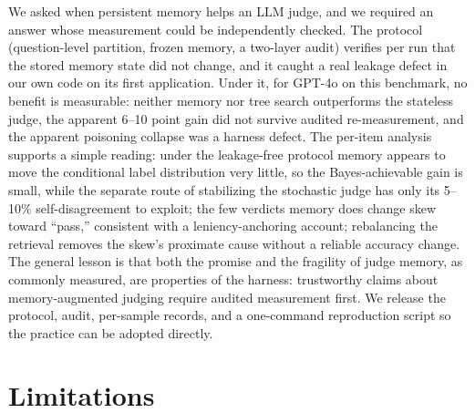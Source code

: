 \documentclass[]{ceurart}
\begin{document}
We asked when persistent memory helps an LLM judge, and we required an answer whose measurement could be independently checked. The protocol (question-level partition, frozen memory, a two-layer audit) verifies per run that the stored memory state did not change, and it caught a real leakage defect in our own code on its first application. Under it, for GPT-4o on this benchmark, no benefit is measurable: neither memory nor tree search outperforms the stateless judge, the apparent 6--10 point gain did not survive audited re-measurement, and the apparent poisoning collapse was a harness defect. The per-item analysis supports a simple reading: under the leakage-free protocol memory appears to move the conditional label distribution very little, so the Bayes-achievable gain is small, while the separate route of stabilizing the stochastic judge has only its 5--10\% self-disagreement to exploit; the few verdicts memory does change skew toward ``pass,'' consistent with a leniency-anchoring account; rebalancing the retrieval removes the skew's proximate cause without a reliable accuracy change. The general lesson is that both the promise and the fragility of judge memory, as commonly measured, are properties of the harness: trustworthy claims about memory-augmented judging require audited measurement first. We release the protocol, audit, per-sample records, and a one-command reproduction script so the practice can be adopted directly.

\section*{Limitations}
\end{document}
